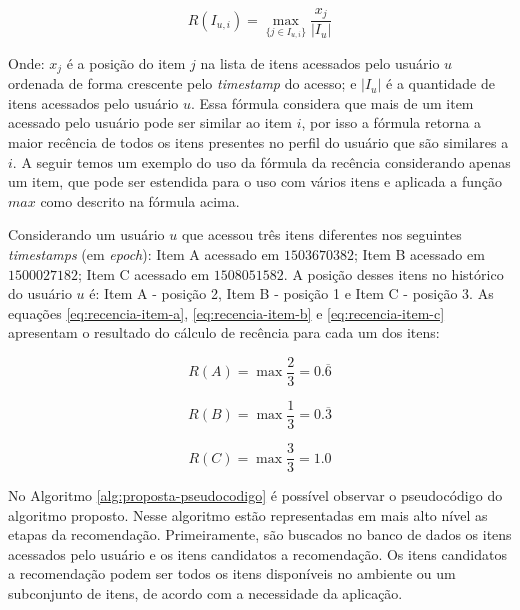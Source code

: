 \begin{equation}
  R(I_{u,i}) = \max_{\{j \in I_{u,i}\}}{\frac{x_j}{\left| I_u \right|}}
  \label{eq:recencia-proposta}
\end{equation}

Onde: $x_j$ é a posição do item $j$ na lista de itens acessados pelo usuário $u$ ordenada de forma crescente pelo
\textit{timestamp} do acesso; e $\left| I_u \right|$ é a quantidade de itens acessados pelo usuário $u$. Essa fórmula considera
que mais de um item acessado pelo usuário pode ser similar ao item $i$, por isso a fórmula retorna a maior recência de
todos os itens presentes no perfil do usuário que são similares a $i$. A seguir temos um exemplo do uso da fórmula da
recência considerando apenas um item, que pode ser estendida para o uso com vários itens e aplicada a função $max$ como descrito na
fórmula acima.

Considerando um usuário $u$ que acessou três itens diferentes nos seguintes \textit{timestamps} (em \textit{epoch}):
Item A acessado em $1503670382$; Item B acessado em $1500027182$; Item C acessado em $1508051582$. A posição desses itens
no histórico do usuário $u$ é: Item A - posição 2, Item B - posição 1 e Item C - posição 3. As equações \ref{eq:recencia-item-a},
\ref{eq:recencia-item-b} e \ref{eq:recencia-item-c} apresentam o resultado do cálculo de recência para cada um dos itens:

\begin{equation}
  R(A) = \max{\frac{2}{3}} = 0.\overline{6}
  \label{eq:recencia-item-a}
\end{equation}

\begin{equation}
  R(B) = \max{\frac{1}{3}} = 0.\overline{3}
  \label{eq:recencia-item-b}
\end{equation}

\begin{equation}
  R(C) = \max{\frac{3}{3}} = 1.0
  \label{eq:recencia-item-c}
\end{equation}

No Algoritmo \ref{alg:proposta-pseudocodigo} é possível observar o pseudocódigo do algoritmo proposto. Nesse algoritmo
estão representadas em mais alto nível as etapas da recomendação. Primeiramente, são buscados no banco de dados os itens acessados
pelo usuário e os itens candidatos a recomendação. Os itens candidatos a recomendação podem ser todos os itens disponíveis
no ambiente ou um subconjunto de itens, de acordo com a necessidade da aplicação.

